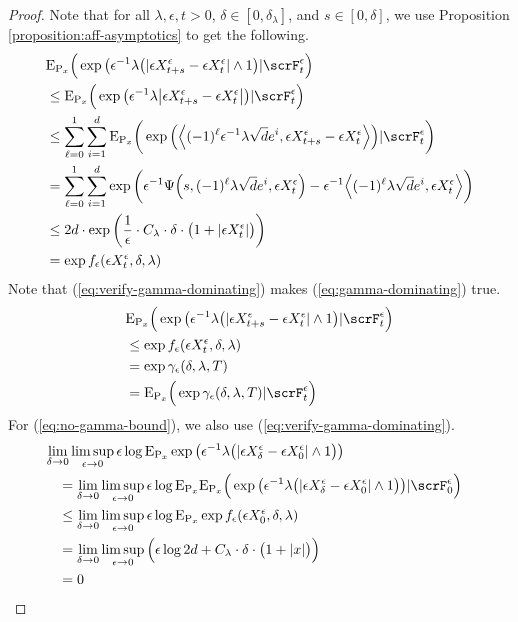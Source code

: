 \begin{proof}
  Note that for all $\lambda, \epsilon, t > 0$, $\delta \in [0,\delta_\lambda]$, and $s \in [0,\delta]$, we use Proposition \ref{proposition:aff-asymptotics} to get the following.
  \begin{align}
    \notag
    &\Exp_{\Prb_\stateVar}\Big(
      \exp\big( \epsilon^{-1} \lambda \big( |\Xe_{t+s}-\Xe_t| \wedge 1 \big) 
      | \scrF^\epsilon_t \Big)  \tag*{} \\
    \notag
    &\leq \Exp_{\Prb_\stateVar}\Big(
      \exp\big( \epsilon^{-1} \lambda \big| \Xe_{t+s}-\Xe_t \big|  \big)
      | \scrF^\epsilon_t \Big) \\
    \notag
    &\leq \sum_{\ell=0}^1 \sum_{i=1}^d \Exp_{\Prb_\stateVar}\bigg(
      \exp\Big( \Bprj{(-1)^\ell\epsilon^{-1}\lambda\sqrt d  \basisVec^i}{\Xe_{t+s}-\Xe_t} \Big)
      | \scrF^\epsilon_t \bigg) \\
    \notag
    &= \sum_{\ell=0}^1 \sum_{i=1}^d \exp\bigg( 
      \epsilon^{-1}\aff\Big(s, (-1)^\ell\lambda\sqrt d \basisVec^i, \Xe_t \Big) 
      - \epsilon^{-1}\Bprj{(-1)^\ell\lambda\sqrt d \basisVec^i}{\Xe_t} \bigg) \\
    \notag
    &\leq 2d \cdot \exp\bigg( \frac1\epsilon \cdot C_\lambda \cdot \delta \cdot \big( 1 + |\Xe_t| \big) \bigg) \\
    &= \exp f_\epsilon(\Xe_t, \delta, \lambda)
    \label{eq:verify-gamma-dominating}
  \end{align}
  Note that (\ref{eq:verify-gamma-dominating}) makes (\ref{eq:gamma-dominating}) true.
  \begin{align*}
    &\Exp_{\Prb_\stateVar}\Big( \exp\big( \epsilon^{-1} \lambda \big( |\Xe_{t+s}-\Xe_t| \wedge 1 \big) | \scrF^\epsilon_t \Big) \\
    &\leq \exp f_\epsilon(\Xe_t, \delta, \lambda) \\
    &= \exp \gamma_\epsilon(\delta, \lambda,T) \\
    &= \Exp_{\Prb_\stateVar}\Big( \exp\gamma_\epsilon(\delta,\lambda,T) | \scrF^\epsilon_t \Big)
  \end{align*}
  For (\ref{eq:no-gamma-bound}), we also use (\ref{eq:verify-gamma-dominating}).
  \begin{align*}
    &\hspace{-1em}\lim_{\delta\rightarrow0} \limsup_{\epsilon\rightarrow0} 
      \epsilon\log\Exp_{\Prb_\stateVar}\exp\big( 
        \epsilon^{-1}\lambda \big(|\Xe_\delta - \Xe_0| \wedge 1\big) 
      \big)  \tag*{} \\
    &=\lim_{\delta\rightarrow0} \limsup_{\epsilon\rightarrow0} 
      \epsilon\log\Exp_{\Prb_\stateVar}
      \Exp_{\Prb_\stateVar}\Big(
      \exp\big(\epsilon^{-1}\lambda \big(|\Xe_\delta - \Xe_0| \wedge 1\big) \big)
      |\scrF^\epsilon_0 \Big) \\
    &\leq \lim_{\delta\rightarrow0}\limsup_{\epsilon\rightarrow0} \epsilon\log\Exp_{\Prb_\stateVar} \exp f_\epsilon(\Xe_0, \delta, \lambda) \\
    &= \lim_{\delta\rightarrow0}\limsup_{\epsilon\rightarrow0} \Big( \epsilon\log 2d + C_\lambda \cdot \delta \cdot \big( 1 + |\stateVar| \big) \Big) \\
    &= 0
  \end{align*}


\end{proof}
